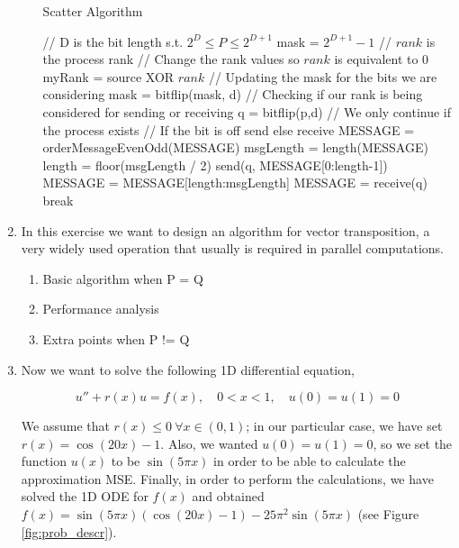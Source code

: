 \documentclass{article}
\begin{document}
\begin{enumerate}
\begin{enumerate}
\begin{algorithm}
\caption{Scatter Algorithm}\label{scatter}
\begin{algorithmic}[1]
\State // D is the bit length s.t. $2^D \leq P \leq 2^{D+1}$
\State mask = $2^{D+1} - 1$
\State // $rank$ is the process rank
\State // Change the rank values so $rank$ is equivalent to $0$ 
\State myRank = source XOR $rank$
	\State // Updating the mask for the bits we are considering
	\State mask = bitflip(mask, d)
	\State // Checking if our rank is being considered for sending or receiving
		\State q = bitflip(p,d)
		\State // We only continue if the process exists
			\State // If the bit is off send else receive
				\State MESSAGE = orderMessageEvenOdd(MESSAGE)
				\State msgLength = length(MESSAGE)
				\State length = floor(msgLength / 2)
				\State send(q, MESSAGE[0:length-1])
				\State MESSAGE = MESSAGE[length:msgLength]
			\Else
				\State MESSAGE = receive(q)
			\EndIf	
		\Else
			\State break
		\EndIf
	\EndIf
\EndFor
\EndProcedure
\end{algorithmic}
\end{algorithm}

\end{enumerate}

\item In this exercise we want to design an algorithm for vector transposition, a very widely used operation that usually is required in parallel computations.

\begin{enumerate}
\item Basic algorithm when P = Q
\item Performance analysis
\item Extra points when P != Q
\end{enumerate}

\item Now we want to solve the following 1D differential equation,

\begin{equation}
	u'' + r(x)u = f(x), \quad 0 < x < 1, \quad u(0) = u(1) = 0
\end{equation}

We assume that $r(x) \leq 0 \ \forall x \in (0,1)$; in our particular case, we have set $r(x) = \cos(20x) - 1$. Also, we wanted $u(0) = u(1) = 0$, so we set the function $u(x)$ to be $\sin(5 \pi x)$ in order to be able to calculate the approximation MSE. Finally, in order to perform the calculations, we have solved the 1D ODE for $f(x)$ and obtained $f(x) = \sin(5 \pi x)(\cos(20x) - 1) - 25 \pi^2 \sin(5 \pi x)$ (see Figure \ref{fig:prob_descr}).


\end{enumerate}
\end{document}
